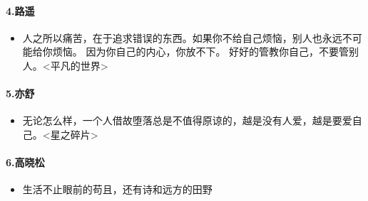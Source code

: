 \documentclass[UTF8,a4paper,8pt]{ctexbook}
\begin{document}
	\paragraph{4.路遥}
			\begin{itemize}
				\item 人之所以痛苦，在于追求错误的东西。如果你不给自己烦恼，别人也永远不可能给你烦恼。 因为你自己的内心，你放不下。 好好的管教你自己，不要管别人。<平凡的世界>
			\end{itemize}
			
			
	\paragraph{5.亦舒}
			\begin{itemize}
				\item  无论怎么样，一个人借故堕落总是不值得原谅的，越是没有人爱，越是要爱自己。<星之碎片>
			\end{itemize}
			
	\paragraph{6.高晓松}
			\begin{itemize}
				\item  生活不止眼前的苟且，还有诗和远方的田野
			\end{itemize}
			
\end{document}
